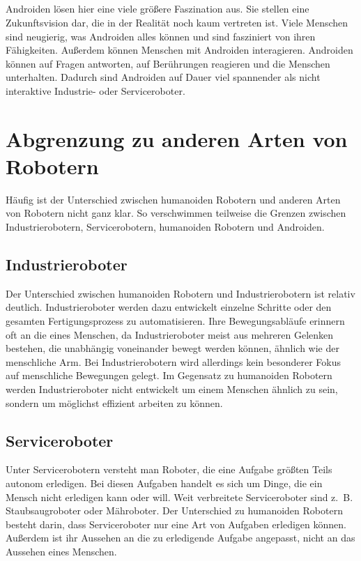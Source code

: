\subparagraph{}
Androiden lösen hier eine viele größere Faszination aus. Sie
stellen eine Zukunftsvision dar, die in der Realität noch kaum vertreten ist.
Viele Menschen sind neugierig, was Androiden alles können und sind fasziniert
von ihren Fähigkeiten. Außerdem können Menschen mit Androiden interagieren.
Androiden können auf Fragen antworten, auf Berührungen reagieren und die
Menschen unterhalten. Dadurch sind Androiden auf Dauer viel spannender als nicht
interaktive Industrie- oder Serviceroboter.

\section{Abgrenzung zu anderen Arten von Robotern}\label{sec:abgrenzung}
Häufig ist der Unterschied zwischen humanoiden Robotern und anderen Arten von
Robotern nicht ganz klar. So verschwimmen teilweise die Grenzen zwischen
Industrierobotern, Servicerobotern, humanoiden Robotern und Androiden.

\subsection{Industrieroboter}\label{sec:industrieroboter}
Der Unterschied zwischen humanoiden Robotern und Industrierobotern ist relativ
deutlich. Industrieroboter werden dazu entwickelt einzelne Schritte oder den
gesamten Fertigungsprozess zu automatisieren. Ihre Bewegungsabläufe erinnern oft
an die eines Menschen, da Industrieroboter meist aus mehreren Gelenken bestehen,
die unabhängig voneinander bewegt werden können, ähnlich wie der menschliche
Arm. \cite{Weber2017} Bei Industrierobotern wird allerdings kein besonderer
Fokus auf menschliche Bewegungen gelegt. Im Gegensatz zu humanoiden Robotern
werden Industrieroboter nicht entwickelt um einem Menschen ähnlich zu sein,
sondern um möglichst effizient arbeiten zu können.

\subsection{Serviceroboter}\label{sec:serviceroboter}
Unter Servicerobotern versteht man Roboter, die eine Aufgabe größten Teils
autonom erledigen. Bei diesen Aufgaben handelt es sich um Dinge, die ein Mensch
nicht erledigen kann oder will. Weit verbreitete Serviceroboter sind z.~B.
Staubsaugroboter oder Mähroboter. Der Unterschied zu humanoiden Robotern besteht
darin, dass Serviceroboter nur eine Art von Aufgaben erledigen können.
Außerdem ist ihr Aussehen an die zu erledigende Aufgabe angepasst, nicht an das
Aussehen eines Menschen.

